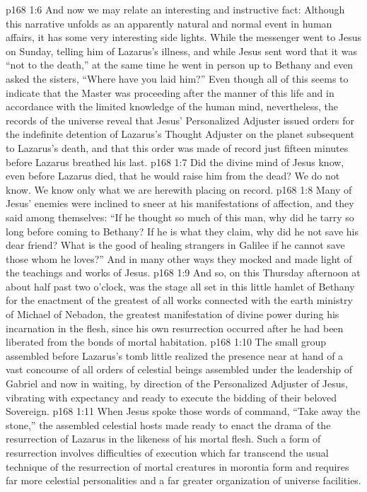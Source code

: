 \vs p168 1:6 \pc And now we may relate an interesting and instructive fact: Although this narrative unfolds as an apparently natural and normal event in human affairs, it has some very interesting side lights. While the messenger went to Jesus on Sunday, telling him of Lazarus’s illness, and while Jesus sent word that it was \textcolor{ubdarkred}{“not to the death,”} at the same time he went in person up to Bethany and even asked the sisters, \textcolor{ubdarkred}{“Where have you laid him?”} Even though all of this seems to indicate that the Master was proceeding after the manner of this life and in accordance with the limited knowledge of the human mind, nevertheless, the records of the universe reveal that Jesus’ Personalized Adjuster issued orders for the indefinite detention of Lazarus’s Thought Adjuster on the planet subsequent to Lazarus’s death, and that this order was made of record just fifteen minutes before Lazarus breathed his last.
\vs p168 1:7 Did the divine mind of Jesus know, even before Lazarus died, that he would raise him from the dead? We do not know. We know only what we are herewith placing on record.
\vs p168 1:8 \pc Many of Jesus’ enemies were inclined to sneer at his manifestations of affection, and they said among themselves: “If he thought so much of this man, why did he tarry so long before coming to Bethany? If he is what they claim, why did he not save his dear friend? What is the good of healing strangers in Galilee if he cannot save those whom he loves?” And in many other ways they mocked and made light of the teachings and works of Jesus.
\vs p168 1:9 And so, on this Thursday afternoon at about half past two o’clock, was the stage all set in this little hamlet of Bethany for the enactment of the greatest of all works connected with the earth ministry of Michael of Nebadon, the greatest manifestation of divine power during his incarnation in the flesh, since his own resurrection occurred after he had been liberated from the bonds of mortal habitation.
\vs p168 1:10 The small group assembled before Lazarus’s tomb little realized the presence near at hand of a vast concourse of all orders of celestial beings assembled under the leadership of Gabriel and now in waiting, by direction of the Personalized Adjuster of Jesus, vibrating with expectancy and ready to execute the bidding of their beloved Sovereign.
\vs p168 1:11 When Jesus spoke those words of command, \textcolor{ubdarkred}{“Take away the stone,”} the assembled celestial hosts made ready to enact the drama of the resurrection of Lazarus in the likeness of his mortal flesh. Such a form of resurrection involves difficulties of execution which far transcend the usual technique of the resurrection of mortal creatures in morontia form and requires far more celestial personalities and a far greater organization of universe facilities.
